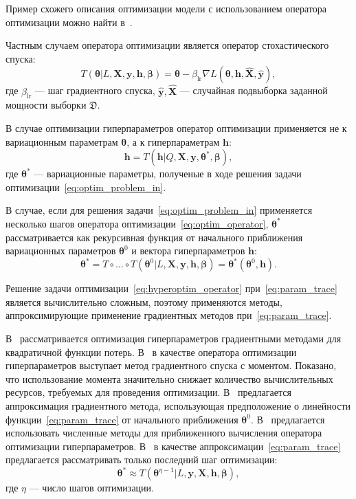 Пример схожего описания оптимизации модели с использованием оператора оптимизации можно найти в~\cite{early}.

Частным случаем оператора оптимизации является оператор стохастического спуска:
\begin{equation}
\label{eq:sgd_operator}
    T( \boldsymbol{\theta}| L,\mathbf{X},  \mathbf{y},  \mathbf{h}, \boldsymbol{\beta}) = \boldsymbol{\theta} - \beta_{\text{lr}} \nabla L(\boldsymbol{\theta},   \mathbf{h},  \hat{\mathbf{X}}, \hat{\mathbf{y}}),
\end{equation}
где $\beta_{\text{lr}}$ --- шаг градиентного спуска, $\hat{\mathbf{y}}, \hat{\mathbf{X}}$ --- случайная подвыборка заданной мощности выборки $\mathfrak{D}$.

В случае оптимизации гиперпараметров оператор оптимизации применяется не к вариационным параметрам $\boldsymbol{\theta}$, а к гиперпараметрам $\mathbf{h}$:
\begin{equation}
\label{eq:hyperoptim_operator}
    \mathbf{h} = T(\mathbf{h} | Q,  \mathbf{X},  \mathbf{y},\boldsymbol{\theta}^{*}, \boldsymbol{\beta}),
\end{equation}
где $\boldsymbol{\theta}^{*}$ --- вариационные параметры, полученые в ходе решения задачи оптимизации~\eqref{eq:optim_problem_in}.

В случае, если для решения задачи~\eqref{eq:optim_problem_in} применяется несколько шагов оператора оптимизации~\eqref{eq:optim_operator},
$\boldsymbol{\theta}^{*}$ рассматривается как рекурсивная функция от начального приближения вариационных параметров $\boldsymbol{\theta}^{0}$ и вектора гиперпараметров $\mathbf{h}$:
\begin{equation}
\label{eq:param_trace}
    \boldsymbol{\theta}^{*} = T \circ \dots \circ T(\boldsymbol{\theta}^0 | L, \mathbf{X}, \mathbf{y},  \mathbf{h}, \boldsymbol{\beta}) = \boldsymbol{\theta}^{*}(\boldsymbol{\theta}^{0}, \mathbf{h}).
\end{equation}

Решение задачи оптимизации~\eqref{eq:hyperoptim_operator} при~\eqref{eq:param_trace} является вычислительно сложным, поэтому применяются методы, аппроксимирующие применение градиентных методов при~\eqref{eq:param_trace}.

В~\cite{hyper_bengio} рассматривается оптимизация гиперпараметров градиентными методами для квадратичной функции потерь. В~\cite{hyper} в качестве оператора оптимизации гиперпараметров выступает метод градиентного спуска с моментом. Показано, что использование момента значительно снижает количество вычислительных ресурсов, требуемых для проведения оптимизации. В~\cite{hyper_mad} предлагается аппроксимация градиентного метода, использующая предположение о линейности функции~\eqref{eq:param_trace} от начального приближения $\boldsymbol{\theta}^0$. В~\cite{hyper_hoag} предлагается использовать численные методы для приближенного вычисления оператора оптимизации гиперпараметров. В~\cite{greed_hyper} в качестве аппроксимации~\eqref{eq:param_trace} предлагается рассматривать только последний шаг оптимизации:
\[
    \boldsymbol{\theta}^{*} \approx T(\boldsymbol{\theta}^{\eta-1} | L, \mathbf{y}, \mathbf{X}, \mathbf{h}, \boldsymbol{\beta}),
\]
где $\eta$ --- число шагов оптимизации.


